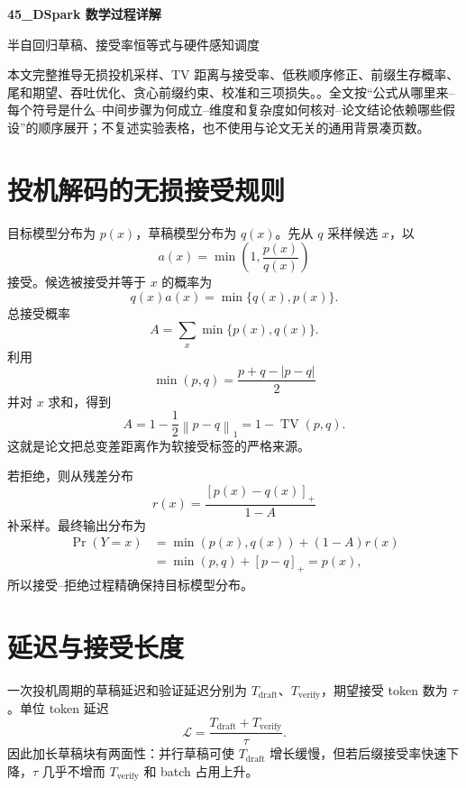\documentclass[UTF8,12pt,a4paper,fontset=none]{ctexart}
\numberwithin{equation}{section}
\newcommand{\norm}[1]{\left\lVert #1\right\rVert}
\begin{document}
\begin{center}
{\LARGE\bfseries 45\_DSpark 数学过程详解}\par
\vspace{0.35em}
{\large 半自回归草稿、接受率恒等式与硬件感知调度}
\end{center}
\vspace{0.45em}
\begin{keybox}[本文只处理真正需要推导的部分]
本文完整推导无损投机采样、TV 距离与接受率、低秩顺序修正、前缀生存概率、尾和期望、吞吐优化、贪心前缀约束、校准和三项损失。。全文按“公式从哪里来--每个符号是什么--中间步骤为何成立--维度和复杂度如何核对--论文结论依赖哪些假设”的顺序展开；不复述实验表格，也不使用与论文无关的通用背景凑页数。
\end{keybox}
\tableofcontents
\newpage

\section{投机解码的无损接受规则}
目标模型分布为 $p(x)$，草稿模型分布为 $q(x)$。先从 $q$ 采样候选 $x$，以
\begin{equation}
 a(x)=\min\left(1,\frac{p(x)}{q(x)}\right)
\end{equation}
接受。候选被接受并等于 $x$ 的概率为
\begin{equation}
 q(x)a(x)=\min\{q(x),p(x)\}.
\end{equation}
总接受概率
\begin{equation}
 A=\sum_x\min\{p(x),q(x)\}.
\end{equation}
利用
\begin{equation}
 \min(p,q)=\frac{p+q-|p-q|}{2}
\end{equation}
并对 $x$ 求和，得到
\begin{equation}
 \boxed{
 A=1-\frac12\norm{p-q}_1
 =1-\operatorname{TV}(p,q).
 }
\end{equation}
这就是论文把总变差距离作为软接受标签的严格来源。

若拒绝，则从残差分布
\begin{equation}
 r(x)=\frac{[p(x)-q(x)]_+}{1-A}
\end{equation}
补采样。最终输出分布为
\begin{align}
 \Pr(Y=x)
 &=\min(p(x),q(x))+(1-A)r(x)\\
 &=\min(p,q)+[p-q]_+=p(x),
\end{align}
所以接受--拒绝过程精确保持目标模型分布。

\section{延迟与接受长度}
一次投机周期的草稿延迟和验证延迟分别为 $T_{\mathrm{draft}}$、$T_{\mathrm{verify}}$，期望接受 token 数为 $\tau$。单位 token 延迟
\begin{equation}
 \boxed{
 \mathcal L=\frac{T_{\mathrm{draft}}+T_{\mathrm{verify}}}{\tau}.
 }
\end{equation}
因此加长草稿块有两面性：并行草稿可使 $T_{\mathrm{draft}}$ 增长缓慢，但若后缀接受率快速下降，$\tau$ 几乎不增而 $T_{\mathrm{verify}}$ 和 batch 占用上升。
\end{document}
